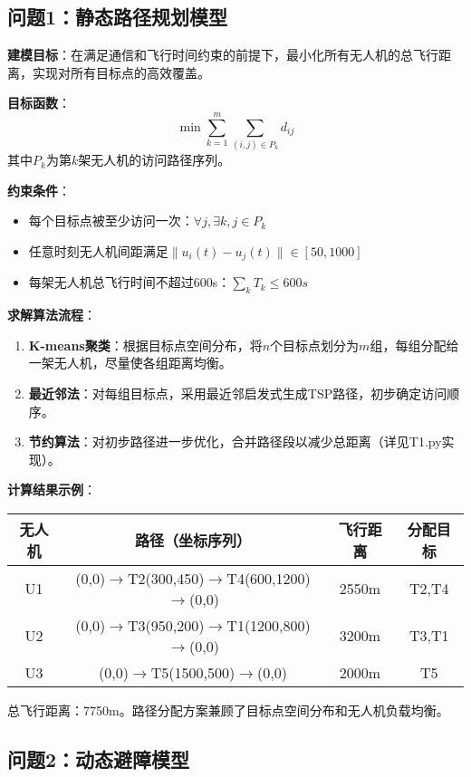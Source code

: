 \documentclass[12pt,fontset=adobe]{ctexart}
\begin{document}
\subsection{问题1：静态路径规划模型}

\textbf{建模目标}：在满足通信和飞行时间约束的前提下，最小化所有无人机的总飞行距离，实现对所有目标点的高效覆盖。

\textbf{目标函数}：
\begin{equation}
  \min \sum_{k=1}^m \sum_{(i,j)\in P_k} d_{ij}
\end{equation}
其中$P_k$为第$k$架无人机的访问路径序列。

\textbf{约束条件}：
\begin{itemize}
  \item 每个目标点被至少访问一次：$\forall j, \exists k, j \in P_k$
  \item 任意时刻无人机间距满足$\|u_i(t)-u_j(t)\| \in [50,1000]$
  \item 每架无人机总飞行时间不超过600s：$\sum_{k} T_k \leq 600s$
\end{itemize}

\textbf{求解算法流程}：
\begin{enumerate}
  \item \textbf{K-means聚类}：根据目标点空间分布，将$n$个目标点划分为$m$组，每组分配给一架无人机，尽量使各组距离均衡。
  \item \textbf{最近邻法}：对每组目标点，采用最近邻启发式生成TSP路径，初步确定访问顺序。
  \item \textbf{节约算法}：对初步路径进一步优化，合并路径段以减少总距离（详见T1.py实现）。
\end{enumerate}

\textbf{计算结果示例}：
\begin{tabular}{|c|c|c|c|}
  \hline
  无人机 & 路径（坐标序列） & 飞行距离 & 分配目标 \\
  \hline
  U1 & (0,0)$\to$T2(300,450)$\to$T4(600,1200)$\to$(0,0) & 2550m & T2,T4 \\
  U2 & (0,0)$\to$T3(950,200)$\to$T1(1200,800)$\to$(0,0) & 3200m & T3,T1 \\
  U3 & (0,0)$\to$T5(1500,500)$\to$(0,0) & 2000m & T5 \\
  \hline
\end{tabular}

总飞行距离：7750m。路径分配方案兼顾了目标点空间分布和无人机负载均衡。

\subsection{问题2：动态避障模型}
\end{document}
